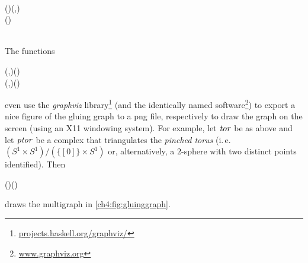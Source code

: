 \begin{hscode}\SaveRestoreHook
{}%
%
%
%
%
\>[B]{}\;\<[21]%
\>[21]{}\mathrel{=}{}\<[21E]%
\>[24]{}\;\<[E]%
\\[\blanklineskip]%
\>[B]{}\mathbin{::}(\;)\Rightarrow {}\;\to (,){}\<[E]%
\\
\>[B]{}\mathrel{=}(\mathbin{\&\&\&})\mathbin{\circ}\<[E]%
\\[\blanklineskip]%
\>[B]{}\mathbin{::}\;\to {}\<[E]%
\\
\>[B]{}\mathrel{=}\;\mathbin{\circ}\<[E]%
\ColumnHook
\end{hscode}\resethooks
The functions\begin{hscode}\SaveRestoreHook
{}%
%
%
\>[3]{}\mathbin{::}(,)\to {}\to {}\;(){}\<[E]%
\\
\>[3]{}\mathbin{::}(,)\to {}\;(){}\<[E]%
\ColumnHook
\end{hscode}\resethooks
even use the \emph{graphviz} library\footnote{%
\href{http://projects.haskell.org/graphviz/index.html}{%
\url{projects.haskell.org/graphviz/}}} (and the identically
named software\footnote{\href{http://www.graphviz.org/}{%
\url{www.graphviz.org}}})
to export a nice figure of the gluing graph to a png file,
respectively to draw the graph on the screen (using an X11 windowing
system). For example, let \ensuremath{\Varid{tor}} be as above and let \ensuremath{\Varid{ptor}} be a complex that
triangulates the \emph{pinched torus} (i.\,e. $(S^1\times S^1)/
(\{[0]\}\times S^1)$ or, alternatively, a $2$-sphere with two
distinct points identified). Then\begin{hscode}\SaveRestoreHook
{}%
%
%
\>[4]{}\mathbin{\$}\mathbin{\$}(\mathbin{\#})(){}\<[E]%
\ColumnHook
\end{hscode}\resethooks
draws the multigraph in \cref{ch4:fig:gluinggraph}.

